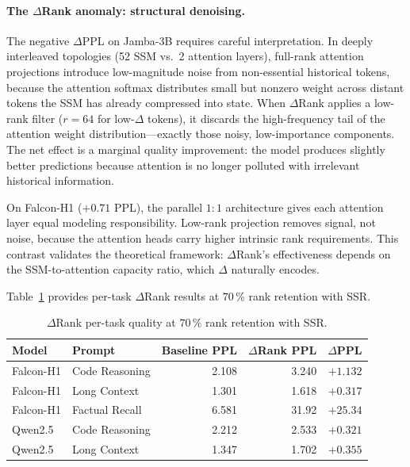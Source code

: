 \documentclass[11pt]{article}
\newcommand{\dsig}{\Delta}
\begin{document}
\paragraph{The $\dsig$Rank anomaly: structural denoising.}
The negative $\Delta$PPL on Jamba-3B requires careful interpretation. In
deeply interleaved topologies (52 SSM vs.\ 2 attention layers), full-rank
attention projections introduce low-magnitude noise from non-essential
historical tokens, because the attention softmax distributes small but
nonzero weight across distant tokens the SSM has already compressed into
state. When $\dsig$Rank applies a low-rank filter ($r{=}64$ for low-$\dsig$
tokens), it discards the high-frequency tail of the attention weight
distribution---exactly those noisy, low-importance components. The net
effect is a marginal quality improvement: the model produces slightly better
predictions because attention is no longer polluted with irrelevant
historical information.

On Falcon-H1 ($+0.71$ PPL), the parallel $1{:}1$ architecture gives each
attention layer equal modeling responsibility. Low-rank projection removes
signal, not noise, because the attention heads carry higher intrinsic rank
requirements. This contrast validates the theoretical framework:
$\dsig$Rank's effectiveness depends on the SSM-to-attention capacity ratio,
which $\dsig$ naturally encodes.

Table~\ref{tab:drank_task} provides per-task $\dsig$Rank results at $70\,\%$
rank retention with SSR.

\begin{table}[H]
\centering
\small
\caption{$\dsig$Rank per-task quality at $70\,\%$ rank retention with SSR.}
\label{tab:drank_task}
\begin{tabular}{llrrr}
\toprule
Model & Prompt & Baseline PPL & $\dsig$Rank PPL & $\Delta$PPL \\
\midrule
Falcon-H1 & Code Reasoning  & 2.108 & 3.240  & $+1.132$ \\
Falcon-H1 & Long Context    & 1.301 & 1.618  & $+0.317$ \\
Falcon-H1 & Factual Recall  & 6.581 & 31.92  & $+25.34$ \\
Qwen2.5   & Code Reasoning  & 2.212 & 2.533  & $+0.321$ \\
Qwen2.5   & Long Context    & 1.347 & 1.702  & $+0.355$ \\
\bottomrule
\end{tabular}
\end{table}
\end{document}
